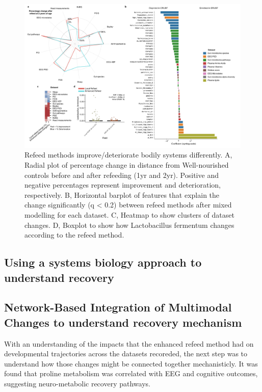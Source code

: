 \documentclass{article}
\begin{document}
\begin{figure}[H]
	\centering
	\includegraphics[scale=0.6]{figures/newrecoveryfeed3.pdf}
	\caption[Refeed methods improve/deteriorate bodily systems differently]{
		Refeed methods improve/deteriorate bodily systems differently.
		A, Radial plot of percentage change in distance from Well-nourished controls before and after refeeding (1yr and 2yr). Positive and negative percentages represent improvement and deterioration, respectively.
		B, Horizontal barplot of features that explain the change significantly (q \textless{} 0.2) between refeed methods after mixed modelling for each dataset.
		C, Heatmap to show clusters of dataset changes.
		D, Boxplot to show how Lactobacillus fermentum changes according to the refeed method.
	}
\label{Figure2}
\end{figure}

\subsection{Using a systems biology approach to understand recovery}

\subsection{Network-Based Integration of Multimodal Changes to understand recovery mechanism}
With an understanding of the impacts that the enhanced refeed method had on developmental trajectories across the datasets recoreded, the next step was to understand how those changes might be connected together mechanisticly.
It was found that proline metabolism was correlated with EEG and cognitive outcomes, suggesting neuro-metabolic recovery pathways.
\end{document}
